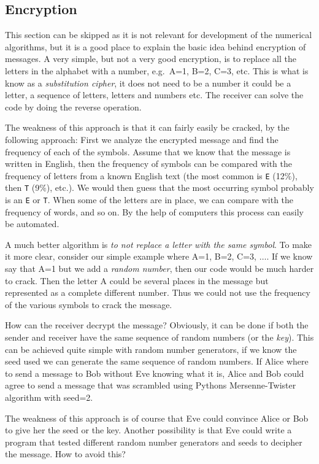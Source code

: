 \documentclass[graybox,sectrefs,envcountresetchap,open=right,final]{svmonodo}
\begin{document}
\subsection{Encryption}
This section can be skipped as it is not relevant for development of
the numerical algorithms, but it is a good place to explain the basic
idea behind encryption of messages. A very simple, but not a very good
encryption, is to replace all the letters in the alphabet with a
number, e.g.~A=1, B=2, C=3, etc. This is what is know as a
\emph{substitution cipher}, it does not need to be a number it could be a
letter, a sequence of letters, letters and numbers etc. The receiver
can solve the code by doing the reverse operation.

The
weakness of this approach is that it can fairly easily be cracked, by
the following approach: First we analyze the encrypted message and find the frequency of each of the symbols.
Assume that we know that the message is written in English, then the
frequency of symbols can be compared with the frequency of
letters from a known English text (the most common is \texttt{E} (12$\%$), then \texttt{T}
(9$\%$), etc.). We would then guess that the most occurring symbol
probably is an \texttt{E} or \texttt{T}. When some of the letters are in place, we
can compare with the frequency of words, and so on. By the help of
computers this process can easily be automated.

A much better algorithm is \emph{to not replace a letter with the same
symbol}. To make it more clear, consider our simple example where A=1, B=2,
C=3, $\ldots$. If we know say that A=1 but we add a \emph{random number},
then our code would be much harder to crack. Then the letter A
could be several places in the message but represented as a complete different
number. Thus we could not use the frequency of the various symbols to
crack the message.

How can the receiver decrypt the message? Obviously, it can be done if
both the sender and receiver have the same sequence of random numbers (or the \emph{key}).
This can be achieved quite simple with random number generators, if we
know the seed  used we can generate the same sequence of
random numbers. If Alice where to send a message to Bob without Eve
knowing what it is, Alice and Bob could agree to send a message that
was scrambled using Pythons Mersenne-Twister algorithm with seed=2.

The weakness of this approach is of course that Eve could convince
Alice or Bob to give her the seed or the key. Another possibility is
that Eve could write a program that tested
different random number generators and seeds to decipher the message.
How to avoid this?
\end{document}
